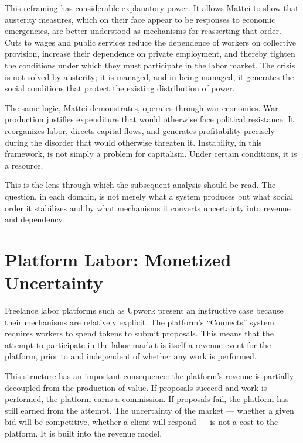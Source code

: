\documentclass[12pt, a4paper]{article}
\begin{document}
This reframing has considerable explanatory power. It allows Mattei to show
that austerity measures, which on their face appear to be responses to
economic emergencies, are better understood as mechanisms for reasserting that
order. Cuts to wages and public services reduce the dependence of workers on
collective provision, increase their dependence on private employment, and
thereby tighten the conditions under which they must participate in the labor
market. The crisis is not solved by austerity; it is managed, and in being
managed, it generates the social conditions that protect the existing
distribution of power.

The same logic, Mattei demonstrates, operates through war economies. War
production justifies expenditure that would otherwise face political
resistance. It reorganizes labor, directs capital flows, and generates
profitability precisely during the disorder that would otherwise threaten it.
Instability, in this framework, is not simply a problem for capitalism. Under
certain conditions, it is a resource.

This is the lens through which the subsequent analysis should be read. The
question, in each domain, is not merely what a system produces but what social
order it stabilizes and by what mechanisms it converts uncertainty into revenue
and dependency.

\section{Platform Labor: Monetized Uncertainty}

Freelance labor platforms such as Upwork present an instructive case because
their mechanisms are relatively explicit. The platform's ``Connects'' system
requires workers to spend tokens to submit proposals. This means that the
attempt to participate in the labor market is itself a revenue event for the
platform, prior to and independent of whether any work is performed.

This structure has an important consequence: the platform's revenue is
partially decoupled from the production of value. If proposals succeed and
work is performed, the platform earns a commission. If proposals fail, the
platform has still earned from the attempt. The uncertainty of the market ---
whether a given bid will be competitive, whether a client will respond ---
is not a cost to the platform. It is built into the revenue model.
\end{document}
